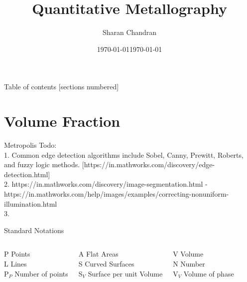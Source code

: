 \documentclass[10pt]{beamer}
\title{Quantitative Metallography}
\author{Sharan Chandran}
\date{\today}
\date{\today}
\institute{Indian Institute of Science}
\begin{document}
\maketitle

\begin{frame}{Table of contents}
  [sections numbered]
  \tableofcontents[hideallsubsections]
\end{frame}

\section{Volume Fraction}

\begin{frame}[fragile]{Metropolis}
Todo: \\
1. Common edge detection algorithms include Sobel, Canny, Prewitt, Roberts, and fuzzy logic methods. [https://in.mathworks.com/discovery/edge-detection.html] \\
2. https://in.mathworks.com/discovery/image-segmentation.html - https://in.mathworks.com/help/images/examples/correcting-nonuniform-illumination.html \\
3. 
\end{frame}


\begin{frame}{Standard Notations}


  \begin{columns}[T,onlytextwidth]
    P Points \\
    L Lines  \\
    P$ _{P} $ Number of points
  
 
   A Flat Areas \\
   S Curved Surfaces \\
   S$ _{V} $ Surface per unit Volume
  
    V Volume \\
    N Number \\
    V$ _{V} $ Volume of phase
\end{columns}     

\end{frame}
\end{document}
